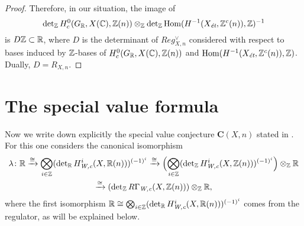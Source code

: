 \documentclass{article}
\numberwithin{equation}{section}
\begin{document}
\begin{proposition}
\begin{proof}
    Therefore, in our situation, the image of
    \[ \det_\ZZ H^0_c (G_\RR, X(\CC), \ZZ(n)) \otimes_\ZZ
      \det_\ZZ \Hom (H^{-1} (X_\et, \ZZ^c (n)), \ZZ)^{-1} \]
    is $D \ZZ \subset \RR$, where $D$ is the determinant of $Reg_{X,n}^\vee$
    considered with respect to bases induced by $\ZZ$-bases of
    $H^0_c (G_\RR, X(\CC), \ZZ(n))$ and
    $\Hom (H^{-1} (X_\et, \ZZ^c (n)), \ZZ)$. Dually, $D = R_{X,n}$.
  \end{proof}
\end{proposition}


\section{The special value formula}
\label{sec:special-value-formula}

Now we write down explicitly the special value conjecture $\mathbf{C} (X,n)$
stated in \cite[\S 4]{Beshenov-Weil-etale-2}. For this one considers the
canonical isomorphism
\begin{multline*}
  \lambda\colon \RR \xrightarrow{\cong}
  \bigotimes_{i\in \ZZ} (\det_\RR H^i_\Wc (X, \RR (n)))^{(-1)^i} \xrightarrow{\cong}
  \Bigl(\bigotimes_{i\in \ZZ} (\det_\ZZ H^i_\Wc (X, \ZZ (n)))^{(-1)^i}\Bigr) \otimes_\ZZ \RR \\
  \xrightarrow{\cong} (\det_\ZZ R\Gamma_\Wc (X, \ZZ (n))) \otimes_\ZZ \RR,
\end{multline*}
where the first isomorphism
$\RR \cong \bigotimes_{i\in \ZZ} (\det_\RR H^i_\Wc (X, \RR (n)))^{(-1)^i}$
comes from the regulator, as will be explained below.

\vspace{1em}
\end{document}
